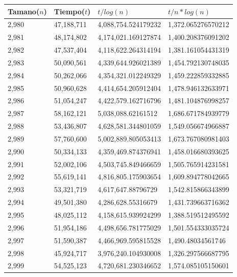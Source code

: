 \begin{table}[H]
\parbox{0.3\textwidth}{
    \begin{tabular}{ | l | l | l | l |}
    \hline
Tamano($n$) & Tiempo($t$) & $t / log(n)$ & $t / n*log(n)$ \\ \hline
2,980 & 47,188,711 & 4,088,754.524179232 & 1,372.065276570212 \\ \hline
2,981 & 48,174,802 & 4,174,021.169127874 & 1,400.208376091202 \\ \hline
2,982 & 47,537,404 & 4,118,622.264314194 & 1,381.161054431319 \\ \hline
2,983 & 50,090,561 & 4,339,644.926021389 & 1,454.792130748035 \\ \hline
2,984 & 50,262,066 & 4,354,321.012249329 & 1,459.222859332885 \\ \hline
2,985 & 50,960,628 & 4,414,654.205912404 & 1,478.946132633971 \\ \hline
2,986 & 51,054,247 & 4,422,579.162716796 & 1,481.104876998257 \\ \hline
2,987 & 58,162,121 & 5,038,088.62161512 & 1,686.671784939779 \\ \hline
2,988 & 53,436,807 & 4,628,581.344801059 & 1,549.056674966887 \\ \hline
2,989 & 57,760,600 & 5,002,889.805053413 & 1,673.767080981403 \\ \hline
2,990 & 50,334,133 & 4,359,469.874376941 & 1,458.016680393625 \\ \hline
2,991 & 52,002,106 & 4,503,745.849466659 & 1,505.765914231581 \\ \hline
2,992 & 55,619,141 & 4,816,805.175903654 & 1,609.894778042665 \\ \hline
2,993 & 53,321,719 & 4,617,647.88796729 & 1,542.815866343899 \\ \hline
2,994 & 49,501,380 & 4,286,628.55316679 & 1,431.739663716362 \\ \hline
2,995 & 48,025,112 & 4,158,615.939924299 & 1,388.519512495592 \\ \hline
2,996 & 51,954,186 & 4,498,656.781775029 & 1,501.554333035724 \\ \hline
2,997 & 51,590,387 & 4,466,969.595815528 & 1,490.48034561746 \\ \hline
2,998 & 45,924,717 & 3,976,240.104930008 & 1,326.297566687795 \\ \hline
2,999 & 54,525,123 & 4,720,681.230346652 & 1,574.085105150601 \\ \hline
    \end{tabular}
}
\end{table}

